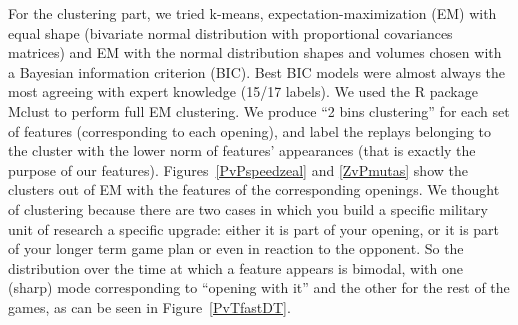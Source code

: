 For the clustering part, we tried k-means, expectation-maximization (EM) with equal shape (bivariate normal distribution with proportional covariances matrices) and EM with the normal distribution shapes and volumes chosen with a Bayesian information criterion (BIC). Best BIC models were almost always the most agreeing with expert knowledge (15/17 labels). We used the R package Mclust \citep{Mclust,Mclust2} to perform full EM clustering. We produce ``2 bins clustering'' for each set of features (corresponding to each opening), and label the replays belonging to the cluster with the lower norm of features' appearances (that is exactly the purpose of our features). Figures~\ref{PvPspeedzeal} %
and \ref{ZvPmutas} show the clusters out of EM with the features of the corresponding openings. We thought of clustering because there are two cases in which you build a specific military unit of research a specific upgrade: either it is part of your opening, or it is part of your longer term game plan or even in reaction to the opponent. So the distribution over the time at which a feature appears is bimodal, with one (sharp) mode corresponding to ``opening with it'' and the other for the rest of the games, as can be seen in Figure~\ref{PvTfastDT}.

